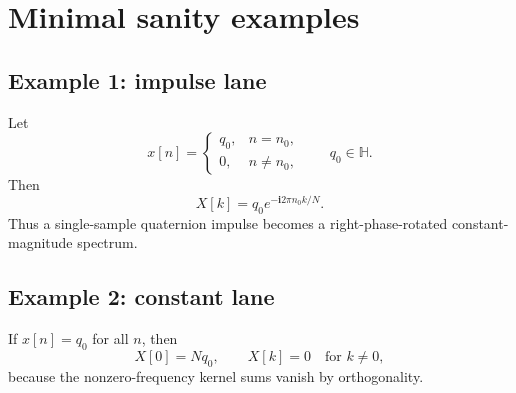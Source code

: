 \documentclass[11pt]{article}
\theoremstyle{remark}
\newcommand{\HH}{\mathbb{H}}
\newcommand{\ii}{\mathbf{i}}
\begin{document}
\section{Minimal sanity examples}

\subsection*{Example 1: impulse lane}

Let
\[
x[n]=
\begin{cases}
q_0, & n=n_0,\\
0, & n\neq n_0,
\end{cases}
\qquad q_0\in\HH.
\]
Then
\[
X[k]=q_0 e^{-\ii 2\pi n_0 k/N}.
\]
Thus a single-sample quaternion impulse becomes a right-phase-rotated constant-magnitude spectrum.

\subsection*{Example 2: constant lane}

If \(x[n]=q_0\) for all \(n\), then
\[
X[0]=Nq_0,
\qquad
X[k]=0\quad \text{for } k\neq 0,
\]
because the nonzero-frequency kernel sums vanish by orthogonality.



\end{document}
